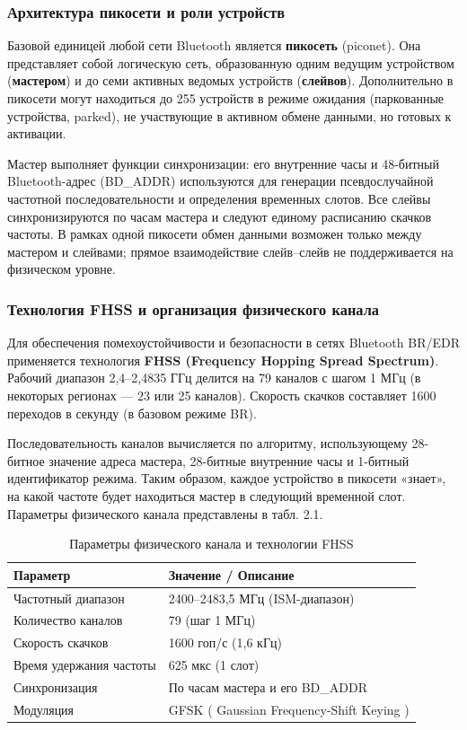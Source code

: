 \subsubsection{Архитектура пикосети и роли устройств}
Базовой единицей любой сети Bluetooth является \textbf{пикосеть} (piconet). Она представляет собой логическую сеть, образованную одним ведущим устройством (\textbf{мастером}) и до семи активных ведомых устройств (\textbf{слейвов}). Дополнительно в пикосети могут находиться до 255 устройств в режиме ожидания (паркованные устройства, parked), не участвующие в активном обмене данными, но готовых к активации.

Мастер выполняет функции синхронизации: его внутренние часы и 48-битный Bluetooth-адрес (BD\_ADDR) используются для генерации псевдослучайной частотной последовательности и определения временных слотов. Все слейвы синхронизируются по часам мастера и следуют единому расписанию скачков частоты. В рамках одной пикосети обмен данными возможен только между мастером и слейвами; прямое взаимодействие слейв–слейв не поддерживается на физическом уровне.

\subsubsection{Технология FHSS и организация физического канала}
Для обеспечения помехоустойчивости и безопасности в сетях Bluetooth BR/EDR применяется технология \textbf{FHSS (Frequency Hopping Spread Spectrum)}. Рабочий диапазон 2,4–2,4835 ГГц делится на 79 каналов с шагом 1 МГц (в некоторых регионах — 23 или 25 каналов). Скорость скачков составляет 1600 переходов в секунду (в базовом режиме BR).

Последовательность каналов вычисляется по алгоритму, использующему 28-битное значение адреса мастера, 28-битные внутренние часы и 1-битный идентификатор режима. Таким образом, каждое устройство в пикосети «знает», на какой частоте будет находиться мастер в следующий временной слот. Параметры физического канала представлены в табл. 2.1.

\begin{table}[htbp]
\centering
\caption{Параметры физического канала и технологии FHSS}
\label{tab:fhss_params}
\begin{tabularx}{\textwidth}{lX}
\toprule
\textbf{Параметр} & \textbf{Значение / Описание} \\
\midrule
Частотный диапазон & 2400–2483,5 МГц (ISM-диапазон) \\
Количество каналов & 79 (шаг 1 МГц) \\
Скорость скачков & 1600 гоп/с (1,6 кГц) \\
Время удержания частоты & 625 мкс (1 слот) \\
Синхронизация & По часам мастера и его BD\_ADDR \\
Модуляция & GFSK ( Gaussian Frequency-Shift Keying ) \\
\bottomrule
\end{tabularx}
\end{table}

